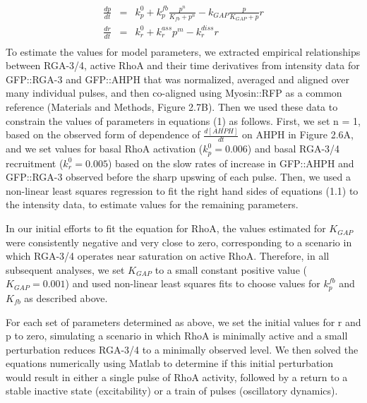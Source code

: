 \documentclass{ucetd}
\begin{document}
{{{{\begin{align}
\begin{split}
  \begin{array}{rcl} \frac{dp}{dt} & = & k_{p}^0 + k_{p}^{fb}\frac{p^n}{K_{fb} + p^n} - k_{GAP}\frac{p}{K_{GAP} + p}r \\ 
\frac{dr}{dt} & = & k_{r}^0 + k_{r}^{ass}p^m - k_{r}^{diss}r  \end{array}
\end{split}
\end{align}
To estimate the values for model parameters, we extracted empirical relationships between RGA-3/4, active RhoA and their time derivatives from intensity data for GFP::RGA-3 and GFP::AHPH that was normalized, averaged and aligned over many individual pulses, and then co-aligned using Myosin::RFP as a common reference (Materials and Methods, Figure 2.7B). Then we used these data to constrain the values of parameters in equations (1) as follows.  First,  we set n = 1, based on the observed form of dependence of $\frac{d[AHPH]}{dt}$ on AHPH in Figure 2.6A, and  we set values for basal  RhoA activation ($k_{p}^0 = 0.006$) and basal RGA-3/4 recruitment ($k_{r}^0 = 0.005$) based on the slow rates of increase in GFP::AHPH and GFP::RGA-3 observed before the sharp upswing of each pulse. Then, we used a non-linear least squares regression to fit the right hand sides of equations (1.1) to the intensity data, to estimate values for the remaining parameters.  



In our initial efforts to fit the equation for RhoA, the values estimated for $K_{GAP}$ were consistently negative and very close to zero,  corresponding to a scenario in which RGA-3/4 operates near saturation on active RhoA. Therefore, in all subsequent analyses, we set $K_{GAP}$ to a small constant positive value ($K_{GAP}=0.001$) and used non-linear least squares fits to choose values for $k_{p}^{fb}$ and $K_{fb}$ as described above.


For each set of parameters determined as above, we set the initial values for r and p to zero,  simulating a scenario in which RhoA is minimally active and a small perturbation reduces RGA-3/4 to a minimally observed level. We then solved the equations numerically using Matlab to determine if this initial perturbation would result in either a single pulse of RhoA activity, followed by a return to a stable inactive state (excitability) or a train of pulses (oscillatory dynamics).  




}}}}
\end{document}

